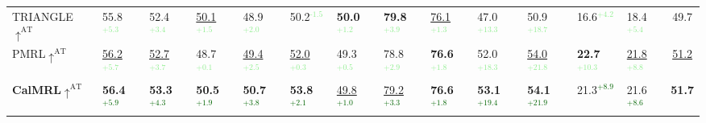 \begin{table}[t]
\begin{adjustbox}{width=\textwidth,center}
\begin{tabular}{@{}l|ll|ll|ll|ll|ll|ll|c@{}}
TRIANGLE$\uparrow^{\text{AT}}$ & 55.8\textcolor{lightgreen}{$^\text{+5.3}$}           & 52.4\textcolor{lightgreen}{$^\text{+3.4}$}           & \underline{50.1}\textcolor{lightgreen}{$^\text{+1.5}$}           & 48.9\textcolor{lightgreen}{$^\text{+2.0}$}           & 50.2\textcolor{lightgreen}{$^\text{-1.5}$}           & \textbf{50.0\textcolor{lightgreen}{$^\text{+1.2}$}}          & \textbf{79.8\textcolor{lightgreen}{$^\text{+3.9}$}}          & \underline{76.1}\textcolor{lightgreen}{$^\text{+1.3}$}           & 47.0\textcolor{lightgreen}{$^\text{+13.3}$}          & 50.9\textcolor{lightgreen}{$^\text{+18.7}$}          & 16.6\textcolor{lightgreen}{$^\text{+4.2}$}           & 18.4\textcolor{lightgreen}{$^\text{+5.4}$}        & 49.7   \\
PMRL$\uparrow^{\text{AT}}$   & \underline{56.2}\textcolor{lightgreen}{$^\text{+5.7}$}           & \underline{52.7}\textcolor{lightgreen}{$^\text{+3.7}$}           & 48.7\textcolor{lightgreen}{$^\text{+0.1}$}           & \underline{49.4}\textcolor{lightgreen}{$^\text{+2.5}$}           & \underline{52.0}\textcolor{lightgreen}{$^\text{+0.3}$}           & 49.3\textcolor{lightgreen}{$^\text{+0.5}$}           & 78.8\textcolor{lightgreen}{$^\text{+2.9}$}           & \textbf{76.6\textcolor{lightgreen}{$^\text{+1.8}$}}           & {52.0}\textcolor{lightgreen}{$^\text{+18.3}$}          & \underline{54.0}\textcolor{lightgreen}{$^\text{+21.8}$}          & \textbf{22.7\textcolor{lightgreen}{$^\text{+10.3}$} }         & \underline{21.8}\textcolor{lightgreen}{$^\text{+8.8}$}       & \underline{51.2}    \\
\midrule
\textbf{CalMRL$\uparrow^{\text{AT}}$}    &  \textbf{56.4\textcolor{darkgreen}{$^\text{+5.9}$} }           & \textbf{53.3\textcolor{darkgreen}{$^\text{+4.3}$}   }         & \textbf{50.5\textcolor{darkgreen}{$^\text{+1.9}$}}           & \textbf{50.7\textcolor{darkgreen}{$^\text{+3.8}$}}           & \textbf{53.8\textcolor{darkgreen}{$^\text{+2.1}$}}           & \underline{49.8}\textcolor{darkgreen}{$^\text{+1.0}$}           & \underline{79.2}\textcolor{darkgreen}{$^\text{+3.3}$}           & \textbf{76.6\textcolor{darkgreen}{$^\text{+1.8}$}}           & \textbf{53.1\textcolor{darkgreen}{$^\text{+19.4}$}}           & \textbf{54.1\textcolor{darkgreen}{$^\text{+21.9}$} }          & 21.3\textcolor{darkgreen}{$^\text{+8.9}$}           & 21.6\textcolor{darkgreen}{$^\text{+8.6}$}        & \textbf{51.7}  \\
\bottomrule\toprule

\end{tabular}
\end{adjustbox}
\end{table}
